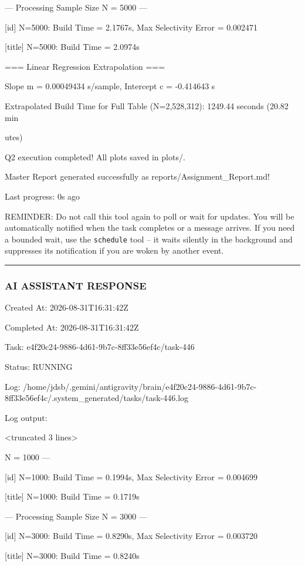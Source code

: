 \documentclass[11pt,a4paper]{article}
\begin{document}
--- Processing Sample Size N = 5000 ---

[id] N=5000: Build Time = 2.1767s, Max Selectivity Error = 0.002471

[title] N=5000: Build Time = 2.0974s

=== Linear Regression Extrapolation ===

Slope m = 0.00049434 s/sample, Intercept c = -0.414643 s

Extrapolated Build Time for Full Table (N=2,528,312): 1249.44 seconds (20.82 min

utes)

Q2 execution completed! All plots saved in plots/.

Master Report generated successfully as reports/Assignment\_Report.md!


Last progress: 0s ago



REMINDER: Do not call this tool again to poll or wait for updates. You will be automatically notified when the task completes or a message arrives. If you need a bounded wait, use the \texttt{schedule} tool -- it waits silently in the background and suppresses its notification if you are woken by another event.


\hrule

\subsubsection{AI ASSISTANT RESPONSE}

Created At: 2026-08-31T16:31:42Z

Completed At: 2026-08-31T16:31:42Z

Task: e4f20c24-9886-4d61-9b7c-8ff33e56ef4c/task-446

Status: RUNNING

Log: /home/jdsb/.gemini/antigravity/brain/e4f20c24-9886-4d61-9b7c-8ff33e56ef4c/.system\_generated/tasks/task-446.log

Log output:

<truncated 3 lines>

N = 1000 ---

[id] N=1000: Build Time = 0.1994s, Max Selectivity Error = 0.004699

[title] N=1000: Build Time = 0.1719s

--- Processing Sample Size N = 3000 ---

[id] N=3000: Build Time = 0.8290s, Max Selectivity Error = 0.003720

[title] N=3000: Build Time = 0.8240s
\end{document}
